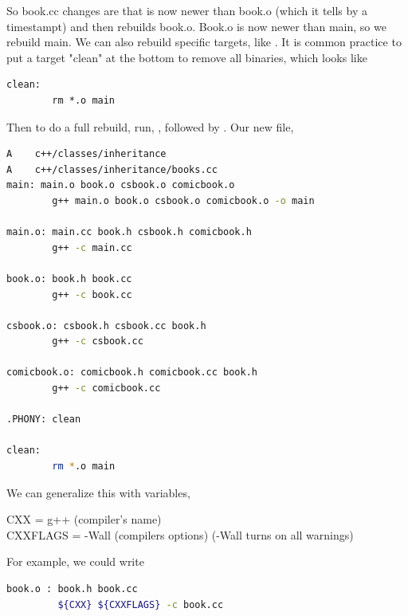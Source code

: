 \documentclass[english, 11pt]{article}
\begin{document}
So book.cc changes are that  is now newer than book.o (which it tells by a timestampt) and then rebuilds book.o. Book.o is now newer than main, so we rebuild main. We can also rebuild specific targets, like . It is common practice to put a target "clean" at the bottom to remove all binaries, which looks like
\begin{lstlisting}
clean:
        rm *.o main
\end{lstlisting}
Then to do a full rebuild, run, , followed by . Our new file,
\begin{lstlisting}[language=bash]
A    c++/classes/inheritance
A    c++/classes/inheritance/books.cc
main: main.o book.o csbook.o comicbook.o
        g++ main.o book.o csbook.o comicbook.o -o main

main.o: main.cc book.h csbook.h comicbook.h
        g++ -c main.cc

book.o: book.h book.cc
        g++ -c book.cc

csbook.o: csbook.h csbook.cc book.h
        g++ -c csbook.cc

comicbook.o: comicbook.h comicbook.cc book.h
        g++ -c comicbook.cc

.PHONY: clean

clean:
        rm *.o main
\end{lstlisting}
We can generalize this with variables,
\begin{center}
  CXX = g++ (compiler's name) \\
  CXXFLAGS = -Wall (compilers options) (-Wall turns on all warnings)
\end{center}
For example, we could write
\begin{lstlisting}[language=bash]
book.o : book.h book.cc
         ${CXX} ${CXXFLAGS} -c book.cc
\end{lstlisting}
\end{document}
